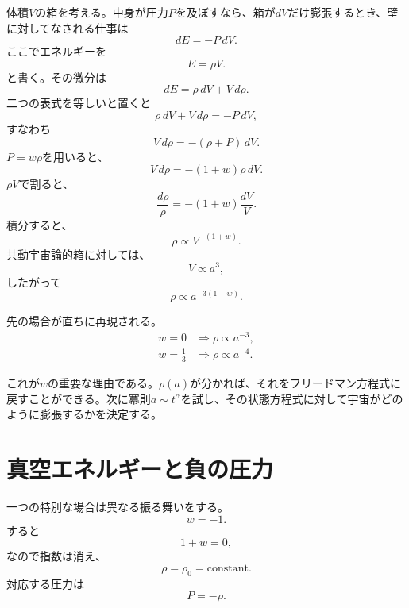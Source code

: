 体積\(V\)の箱を考える。中身が圧力\(P\)を及ぼすなら、箱が\(dV\)だけ膨張するとき、壁に対してなされる仕事は
\begin{equation}
dE=-P\,dV.
\end{equation}
ここでエネルギーを
\begin{equation}
E=\rho V.
\end{equation}
と書く。その微分は
\begin{equation}
dE=\rho\,dV+V\,d\rho .
\end{equation}
二つの表式を等しいと置くと
\begin{equation}
\rho\,dV+V\,d\rho=-P\,dV,
\end{equation}
すなわち
\begin{equation}
V\,d\rho=-(\rho+P)\,dV.
\end{equation}
\(P=w\rho\)を用いると、
\begin{equation}
V\,d\rho=-(1+w)\rho\,dV.
\end{equation}
\(\rho V\)で割ると、
\begin{equation}
\frac{d\rho}{\rho}=-(1+w)\frac{dV}{V}.
\end{equation}
積分すると、
\begin{equation}
\rho \propto V^{-(1+w)}.
\end{equation}
共動宇宙論的箱に対しては、
\begin{equation}
V\propto a^3,
\end{equation}
したがって
\begin{equation}
\rho \propto a^{-3(1+w)}.
\end{equation}

先の場合が直ちに再現される。
\begin{align}
w=0 &\Longrightarrow \rho \propto a^{-3},\\
w=\frac{1}{3} &\Longrightarrow \rho \propto a^{-4}.
\end{align}

これが\(w\)の重要な理由である。\(\rho(a)\)が分かれば、それをフリードマン方程式に戻すことができる。次に冪則\(a\sim t^\alpha\)を試し、その状態方程式に対して宇宙がどのように膨張するかを決定する。

\section{真空エネルギーと負の圧力}

一つの特別な場合は異なる振る舞いをする。
\begin{equation}
w=-1.
\end{equation}
すると
\begin{equation}
1+w=0,
\end{equation}
なので指数は消え、
\begin{equation}
\rho=\rho_0=\text{constant}.
\end{equation}
対応する圧力は
\begin{equation}
P=-\rho .
\end{equation}

